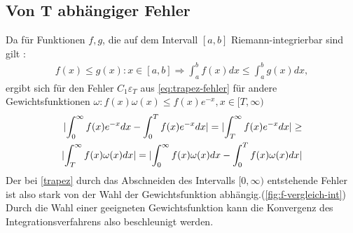 \documentclass[12pt,a4paper]{scrartcl}
\numberwithin{equation}{section}
\numberwithin{myalgctr}{section}
\numberwithin{mytheoremctr}{subsection}
\numberwithin{mykorollarctr}{subsection}
\numberwithin{mylemmactr}{subsection}
\numberwithin{mybeispielctr}{subsection}
\DeclarePairedDelimiter{\abs}{\lvert}{\rvert}
\begin{document}
		\subsection{Von T abh\"angiger Fehler}
	Da f\"ur Funktionen $f,g$, die auf dem Intervall $[a,b]$ Riemann-integrierbar sind gilt \autocite[vgl.][271]{ana2}: 
	\begin{align*}
	f(x)\leq g(x): x \in [a,b]\Rightarrow \int_{a}^{b}f(x)dx \leq \int_{a}^{b}g(x)dx,
	\end{align*}
	ergibt sich f\"ur den Fehler $C_1\varepsilon_T$ aus \cref{eq:trapez-fehler} f\"ur andere Gewichtsfunktionen $\omega : f(x)\omega(x) \leq f(x)e^{-x}, x \in [T,\infty)$
	\begin{align*}
	\abs{\int_{0}^{\infty}f(x)e^{-x}dx-\int_{0}^{T}f(x)e^{-x}dx} = \abs{\int_{T}^{\infty}f(x)e^{-x}dx} \geq \\
	\abs{\int_{T}^{\infty}f(x)\omega(x)dx} =  \abs{\int_{0}^{\infty}f(x)\omega(x)dx-\int_{0}^{T}f(x)\omega(x)dx}
	\end{align*}	
	Der bei \cref{trapez} durch das Abschneiden des Intervalls $[0,\infty)$ entstehende Fehler ist also stark von der Wahl der Gewichtsfunktion abh\"angig.(\cref{fig:f-vergleich-int}) 
	Durch die Wahl einer geeigneten Gewichtsfunktion kann die Konvergenz des Integrationsverfahrens also beschleunigt werden.
	
\end{document}
